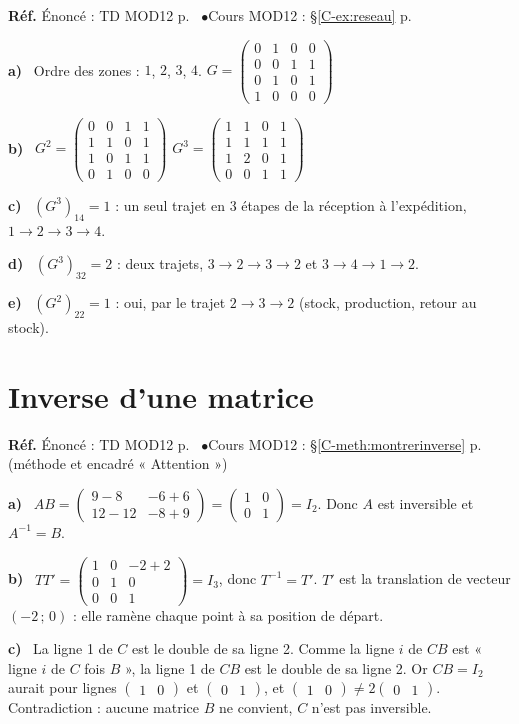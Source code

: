 \documentclass[a4paper,11pt]{article}
\newcommand{\M}[1]{\begin{pmatrix}#1\end{pmatrix}}
\newcommand{\cours}[1]{§\ref{C-#1} p.~\pageref{C-#1}}
\newcommand{\source}[2]{{\footnotesize\color{uimmgray}\textbf{Réf.} \enspace Énoncé : TD MOD12 p.~\pageref{T-#1} \enspace$\bullet$\enspace Cours MOD12 : #2}\par\smallskip}
\newcommand{\q}[1]{\textbf{\color{uimmblue}#1}\ }
\begin{document}
\begin{correction}
\source{exo:10}{\cours{ex:reseau}}
\q{a)} Ordre des zones : $1$, $2$, $3$, $4$.
\qquad
$G = \M{0 & 1 & 0 & 0\\ 0 & 0 & 1 & 1\\ 0 & 1 & 0 & 1\\ 1 & 0 & 0 & 0}$

\q{b)}
$G^2 = \M{0 & 0 & 1 & 1\\ 1 & 1 & 0 & 1\\ 1 & 0 & 1 & 1\\ 0 & 1 & 0 & 0}$
\qquad
$G^3 = \M{1 & 1 & 0 & 1\\ 1 & 1 & 1 & 1\\ 1 & 2 & 0 & 1\\ 0 & 0 & 1 & 1}$

\q{c)} $(G^3)_{14} = 1$ : un seul trajet en $3$ étapes de la réception à l'expédition, $1\to 2\to 3\to 4$.

\q{d)} $(G^3)_{32} = 2$ : deux trajets, $3\to 2\to 3\to 2$ et $3\to 4\to 1\to 2$.

\q{e)} $(G^2)_{22} = 1$ : oui, par le trajet $2\to 3\to 2$ (stock, production, retour au stock).
\end{correction}

\needspace{8cm}
\section{Inverse d'une matrice}

\begin{correction}
\source{exo:11}{\cours{meth:montrerinverse} (méthode et encadré « Attention »)}
\q{a)} $AB = \M{9-8 & -6+6\\ 12-12 & -8+9} = \M{1 & 0\\ 0 & 1} = I_2$. Donc $A$ est inversible et $A^{-1} = B$.

\q{b)} $TT' = \M{1 & 0 & -2+2\\ 0 & 1 & 0\\ 0 & 0 & 1} = I_3$, donc $T^{-1} = T'$. $T'$ est la translation de vecteur $(-2\,;\,0)$ : elle ramène chaque point à sa position de départ.

\q{c)} La ligne 1 de $C$ est le double de sa ligne 2. Comme la ligne $i$ de $CB$ est « ligne $i$ de $C$ fois $B$ », la ligne 1 de $CB$ est le double de sa ligne 2. Or $CB = I_2$ aurait pour lignes $\M{1 & 0}$ et $\M{0 & 1}$, et $\M{1 & 0}\neq 2\M{0 & 1}$. Contradiction : aucune matrice $B$ ne convient, $C$ n'est pas inversible.
\end{correction}
\end{document}
